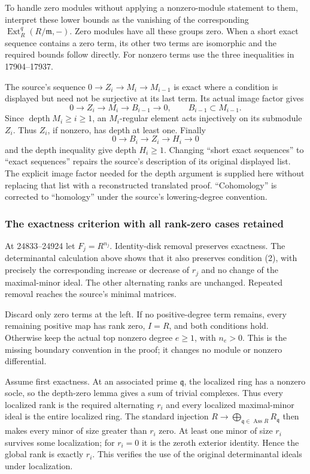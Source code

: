 To handle zero modules without applying a nonzero-module statement to them, interpret these lower bounds as the vanishing of the corresponding \(\operatorname{Ext}^q_R(R/\mathfrak m,-)\). Zero modules have all these groups zero. When a short exact sequence contains a zero term, its other two terms are isomorphic and the required bounds follow directly. For nonzero terms use the three inequalities in 17904--17937.

The source's sequence \(0\to Z_i\to M_i\to M_{i-1}\) is exact where a condition is displayed but need not be surjective at its last term. Its actual image factor gives \[
 0\longrightarrow Z_i\longrightarrow M_i\longrightarrow B_{i-1}
 \longrightarrow0,\qquad B_{i-1}\subset M_{i-1}.
\] Since \(\operatorname{depth}M_i\ge i\ge1\), an \(M_i\)-regular element acts injectively on its submodule \(Z_i\). Thus \(Z_i\), if nonzero, has depth at least one. Finally \[
 0\longrightarrow B_i\longrightarrow Z_i\longrightarrow H_i
 \longrightarrow0
\] and the depth inequality give depth \(H_i\ge1\). Changing ``short exact sequences'' to ``exact sequences'' repairs the source's description of its original displayed list. The explicit image factor needed for the depth argument is supplied here without replacing that list with a reconstructed translated proof. ``Cohomology'' is corrected to ``homology'' under the source's lowering-degree convention.

\subsubsection{The exactness criterion with all rank-zero cases retained}\label{algebra-proof-018-the-exactness-criterion-with-all-rank-zero-cases-retained}

At 24833--24924 let \(F_j=R^{n_j}\). Identity-disk removal preserves exactness. The determinantal calculation above shows that it also preserves condition (2), with precisely the corresponding increase or decrease of \(r_j\) and no change of the maximal-minor ideal. The other alternating ranks are unchanged. Repeated removal reaches the source's minimal matrices.

Discard only zero terms at the left. If no positive-degree term remains, every remaining positive map has rank zero, \(I=R\), and both conditions hold. Otherwise keep the actual top nonzero degree \(e\ge1\), with \(n_e>0\). This is the missing boundary convention in the proof; it changes no module or nonzero differential.

Assume first exactness. At an associated prime \(\mathfrak q\), the localized ring has a nonzero socle, so the depth-zero lemma gives a sum of trivial complexes. Thus every localized rank is the required alternating \(r_i\) and every localized maximal-minor ideal is the entire localized ring. The standard injection \(R\to\bigoplus_{\mathfrak q\in\operatorname{Ass}R}R_{\mathfrak q}\) then makes every minor of size greater than \(r_i\) zero. At least one minor of size \(r_i\) survives some localization; for \(r_i=0\) it is the zeroth exterior identity. Hence the global rank is exactly \(r_i\). This verifies the use of the original determinantal ideals under localization.

